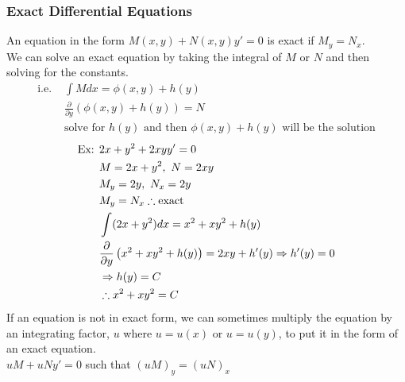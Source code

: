 \documentclass[11pt, fleqn]{article}
\begin{document}
\subsubsection{Exact Differential Equations}
An equation in the form $M(x,y)+N(x,y)y'=0$ is exact if $M_y=N_x$.\\
We can solve an exact equation by taking the integral of $M$ or $N$ and then solving for the constants.
\begin{align*}
    \text{i.e. }&\int M dx=\phi(x,y)+h(y)\\
    &\frac{\partial}{\partial y}(\phi(x,y)+h(y))=N\\
    &\text{solve for $h(y)$ and then $\phi(x,y)+h(y)$ will be the solution}
\end{align*}
\begin{align*}
    \text{Ex: }&2x+y^2+2xyy'=0\\
    &M=2x+y^2,\ N=2xy\\
    &M_y=2y,\ N_x=2y\\
    &M_y=N_x\therefore\text{exact}\\
    &\int(2x+y^2)dx=x^2+xy^2+h(y)\\
    &\frac{\partial}{\partial y}\left( x^2+xy^2+h(y) \right)=2xy+h'(y)\Rightarrow h'(y)=0\\
    &\Rightarrow h(y)=C\\
    &\therefore x^2+xy^2=C
\end{align*}
If an equation is not in exact form, we can sometimes multiply the equation by an integrating factor, $u$ where $u=u(x)$ or $u=u(y)$, to put it in the form of an exact equation.\\
$uM+uNy'=0$ such that $(uM)_y=(uN)_x$
\end{document}
